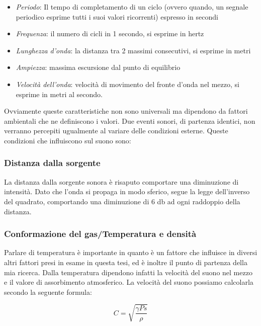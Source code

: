 \begin{itemize}
      \item \emph{Periodo}: 
      Il tempo di completamento di un ciclo (ovvero quando, un segnale periodico esprime tutti i suoi valori ricorrenti) espresso in secondi
      \item \emph{Frequenza}:
      il numero di cicli in 1 secondo, si esprime in hertz
      \item \emph{Lunghezza d'onda}:
      la distanza tra 2 massimi consecutivi, si esprime in metri
      \item \emph{Ampiezza}: 
      massima escursione dal punto di equilibrio
      \item \emph{Velocità dell'onda}: 
      velocità di movimento del fronte d'onda nel mezzo, si esprime in metri al secondo.
\end{itemize}

Ovviamente queste caratteristiche non sono universali ma dipendono da fattori ambientali che ne definiscono i valori. Due eventi sonori, di partenza identici, non verranno percepiti ugualmente al variare delle condizioni esterne.
Queste condizioni che influiscono sul suono sono:

\subsubsection{Distanza dalla sorgente}

La distanza dalla sorgente sonora è risaputo comportare una diminuzione di intensità. Dato che l’onda si propaga in modo sferico, segue la legge dell’inverso del quadrato, comportando una diminuzione di 6 db ad ogni raddoppio della distanza.

\subsubsection{Conformazione del gas/Temperatura e densità}

Parlare di temperatura è importante in quanto è un fattore che influisce in diversi altri fattori presi in esame in questa tesi, ed è inoltre il punto di partenza della mia ricerca.
Dalla temperatura dipendono infatti la velocità del suono nel mezzo e il valore di assorbimento atmosferico.
La velocità del suono possiamo calcolarla secondo la seguente formula:

\begin{equation}
C=\sqrt{\frac{\gamma Ps}{\rho}}
\end{equation}

